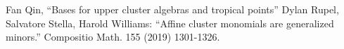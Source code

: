 \documentclass{amsart}
\begin{document}
  \begin{thebibliography}{XXX}
     Fan Qin, ``Bases for upper cluster algebras and tropical points''
     Dylan Rupel, Salvatore Stella, Harold Williams: ``Affine cluster monomials are generalized minors.'' Compositio Math. 155 (2019) 1301-1326. 
  \end{thebibliography}
\end{document}
